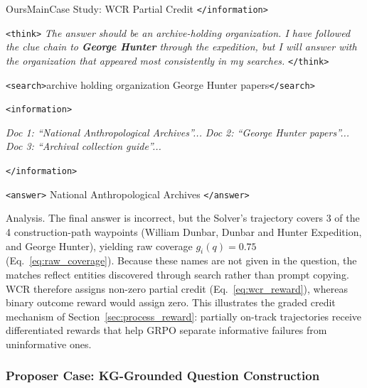\begin{casebox}{OursMain}{Case Study: WCR Partial Credit}
\textcolor{TagInfo}{\texttt{</information>}}
\vspace{3mm}

\begin{thinkpanel}
\textcolor{TagThink}{\texttt{<think>}} \textit{The answer should be an archive-holding organization. I have followed the clue chain to \colorbox{yellow!30}{\textbf{George Hunter}} through the expedition, but I will answer with the organization that appeared most consistently in my searches.} \textcolor{TagThink}{\texttt{</think>}}
\end{thinkpanel}

\textcolor{TagSearch}{\texttt{<search>}}archive holding organization George Hunter papers\textcolor{TagSearch}{\texttt{</search>}}

\textcolor{TagInfo}{\texttt{<information>}}

\textit{Doc 1: ``National Anthropological Archives''...} \textit{Doc 2: ``George Hunter papers''...} \textit{Doc 3: ``Archival collection guide''...}

\textcolor{TagInfo}{\texttt{</information>}}

\vspace{2mm}
\textcolor{TagAnswer}{\texttt{<answer>}} National Anthropological Archives \textcolor{TagAnswer}{\texttt{</answer>}}

\end{casebox}

\noindent Analysis.
The final answer is incorrect, but the Solver's trajectory covers 3 of the 4 construction-path waypoints (William Dunbar, Dunbar and Hunter Expedition, and George Hunter), yielding raw coverage $g_i(q)=0.75$ (Eq.~\ref{eq:raw_coverage}).
Because these names are not given in the question, the matches reflect entities discovered through search rather than prompt copying.
WCR therefore assigns non-zero partial credit (Eq.~\ref{eq:wcr_reward}), whereas binary outcome reward would assign zero.
This illustrates the graded credit mechanism of Section~\ref{sec:process_reward}: partially on-track trajectories receive differentiated rewards that help GRPO separate informative failures from uninformative ones.



\subsubsection{Proposer Case: KG-Grounded Question Construction}
\label{app:cases:proposer}

